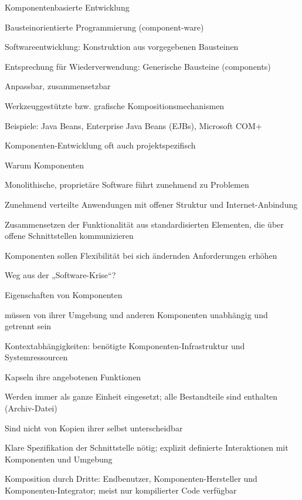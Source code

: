 \documentclass[a4paper]{article}
\begin{document}
\begin{multicols}{3}
  Komponentenbasierte Entwicklung
  \begin{itemize*}
    \item Bausteinorientierte Programmierung (component-ware)
    \item Softwareentwicklung: Konstruktion aus vorgegebenen Bausteinen
    \item Entsprechung für Wiederverwendung: Generische Bausteine (components)
    \begin{itemize*}
      \item Anpassbar, zusammensetzbar
    \end{itemize*}
    \item Werkzeuggestützte bzw. grafische Kompositionsmechanismen
    \item Beispiele: Java Beans, Enterprise Java Beans (EJBs), Microsoft COM+
    \item Komponenten-Entwicklung oft auch projektspezifisch
    \item Warum Komponenten
    \begin{itemize*}
      \item Monolithische, proprietäre Software führt zunehmend zu Problemen
      \item Zunehmend verteilte Anwendungen mit offener Struktur und Internet-Anbindung
      \item Zusammensetzen der Funktionalität aus standardisierten Elementen, die über offene Schnittstellen kommunizieren
      \item Komponenten sollen Flexibilität bei sich ändernden Anforderungen erhöhen
      \item Weg aus der „Software-Krise“?
    \end{itemize*}
    \item Eigenschaften von Komponenten
    \begin{itemize*}
      \item müssen von ihrer Umgebung und anderen Komponenten unabhängig und getrennt sein
      \item Kontextabhängigkeiten: benötigte Komponenten-Infrastruktur und Systemressourcen
      \item Kapseln ihre angebotenen Funktionen
      \item Werden immer als ganze Einheit eingesetzt; alle Bestandteile sind enthalten (Archiv-Datei)
      \item Sind nicht von Kopien ihrer selbst unterscheidbar
      \item Klare Spezifikation der Schnittstelle nötig; explizit definierte Interaktionen mit Komponenten und Umgebung
      \item Komposition durch Dritte: Endbenutzer, Komponenten-Hersteller und Komponenten-Integrator; meist nur kompilierter Code verfügbar
    \end{itemize*}
  \end{itemize*}


\end{multicols}
\end{document}
